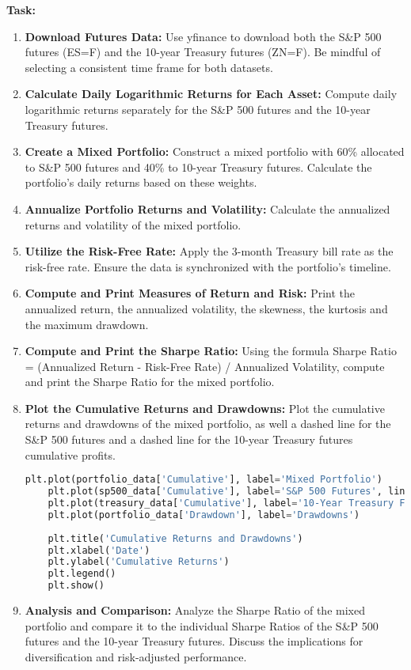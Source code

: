 \documentclass{article}
\begin{document}
\textbf{Task:}
\begin{enumerate}
    \item \textbf{Download Futures Data:} Use yfinance to download both the S\&P 500 futures (ES=F) and the 10-year Treasury futures (ZN=F). Be mindful of selecting a consistent time frame for both datasets.
    
    \item \textbf{Calculate Daily Logarithmic Returns for Each Asset:} Compute daily logarithmic returns separately for the S\&P 500 futures and the 10-year Treasury futures.
    
    \item \textbf{Create a Mixed Portfolio:} Construct a mixed portfolio with 60\% allocated to S\&P 500 futures and 40\% to 10-year Treasury futures. Calculate the portfolio's daily returns based on these weights.
    
    \item \textbf{Annualize Portfolio Returns and Volatility:} Calculate the annualized returns and volatility of the mixed portfolio.
    
    \item \textbf{Utilize the Risk-Free Rate:} Apply the 3-month Treasury bill rate as the risk-free rate. Ensure the data is synchronized with the portfolio's timeline.

    \item \textbf{Compute and Print Measures of Return and Risk:}
    Print the annualized return, the annualized volatility, the skewness, the kurtosis and the maximum drawdown.

    \item \textbf{Compute and Print the Sharpe Ratio:} Using the formula Sharpe Ratio = (Annualized Return - Risk-Free Rate) / Annualized Volatility, compute and print the Sharpe Ratio for the mixed portfolio.

    \item \textbf{Plot the Cumulative Returns and Drawdowns:} Plot the cumulative returns and drawdowns of the mixed portfolio, as well a dashed line for the S\&P 500 futures and a dashed line for the 10-year Treasury futures cumulative profits.

    \begin{lstlisting}[language=Python]
    plt.plot(portfolio_data['Cumulative'], label='Mixed Portfolio')
    plt.plot(sp500_data['Cumulative'], label='S&P 500 Futures', linestyle='dashed')
    plt.plot(treasury_data['Cumulative'], label='10-Year Treasury Futures', linestyle='dashed')
    plt.plot(portfolio_data['Drawdown'], label='Drawdowns')
    
    plt.title('Cumulative Returns and Drawdowns')
    plt.xlabel('Date')
    plt.ylabel('Cumulative Returns')
    plt.legend()
    plt.show()
    \end{lstlisting}
    
    \item \textbf{Analysis and Comparison:} Analyze the Sharpe Ratio of the mixed portfolio and compare it to the individual Sharpe Ratios of the S\&P 500 futures and the 10-year Treasury futures. Discuss the implications for diversification and risk-adjusted performance.
\end{enumerate}
\end{document}
